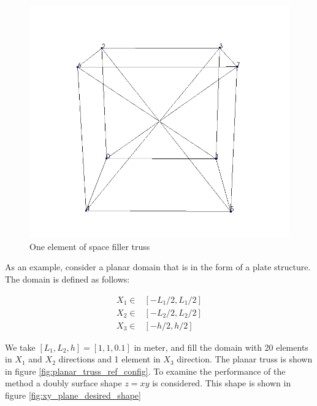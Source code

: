 \begin{figure} 
\centering
\includegraphics[width=5.0in]{./chap_5_active_trusses/images_space_filler/cube.png}
\caption{One element of space filler truss}
\label{fig:cuber_space_filler_truss}
\end{figure}

As an example, consider a planar domain that is in the form of a plate structure.
The domain is defined as follows:

\begin{equation}
\begin{aligned}
X_1 \in & [-L_1/2,L_1/2] \\
X_2 \in & [-L_2/2,L_2/2] \\
X_3 \in & [-h/2,h/2]
\end{aligned}
\label{planar_truss_domain:eqn}
\end{equation}
 
We take $[L_1,L_2,h]=[1,1,0.1]$ in meter, and fill the domain with 20 elements in $X_1$ and $X_2$ directions and 1 element in $X_3$ direction. 
The planar truss is shown in figure \ref{fig:planar_truss_ref_config}.  
To examine the performance of the method a doubly surface shape $z=xy$ is considered.
This shape is shown in figure \ref{fig:xy_plane_desired_shape}

